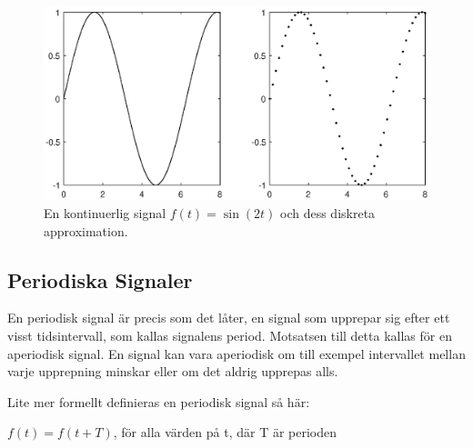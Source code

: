 \documentclass{article}
\begin{document}
\begin{figure}[ht]
\centerline{\includegraphics[scale=0.55]{images/diskretisering.eps}}
\caption{En kontinuerlig signal $f(t) = \sin(2 t)$ och dess diskreta approximation.}
\label{}
\end{figure}

\subsection{Periodiska Signaler}
En periodisk signal är precis som det låter, en signal som upprepar sig efter
ett visst tidsintervall, som kallas signalens period. Motsatsen till detta
kallas för en aperiodisk signal.
En signal kan vara aperiodisk om till exempel intervallet mellan varje
upprepning minskar eller om det aldrig upprepas alls.

Lite mer formellt definieras en periodisk signal så här:

$f(t) = f(t+T)$, för alla värden på t, där T är perioden
\end{document}
